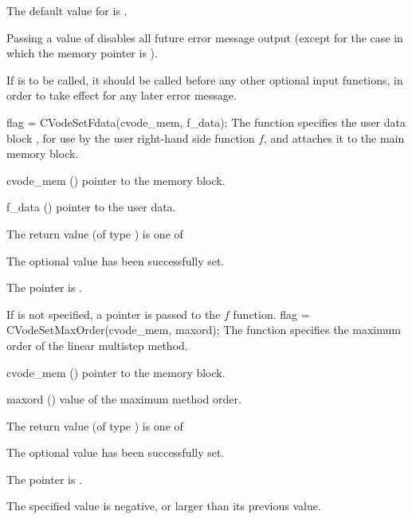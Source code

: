 {
  The default value for  is . 

  Passing a value of  disables all future error message output
  (except for the case in which the {\cvode} memory pointer is ).

  {\warn}If  is to be called, it should be called before any
  other optional input functions, in order to take effect for any later error message.
}
{
  flag = CVodeSetFdata(cvode\_mem, f\_data);
}
{
  The function  specifies the user data block ,
  for use by the user right-hand side function $f$, and attaches it to the main 
  {\cvode} memory block.
}
{
  \begin{args}
  \item[cvode\_mem] ()
    pointer to the {\cvode} memory block.
  \item[f\_data] ()
    pointer to the user data.
  \end{args}
}
{
  The return value  (of type ) is one of
  \begin{args}
  \item[\Id{CV\_SUCCESS}] 
    The optional value has been successfully set.
  \item[\Id{CV\_MEM\_NULL}]
    The  pointer is .
  \end{args}
}
{
  If  is not specified, a  pointer is
  passed to the $f$ function.
}
{
flag = CVodeSetMaxOrder(cvode\_mem, maxord);
}
{
  The function  specifies the maximum order of the 
  linear multistep method.
}
{
  \begin{args}
  \item[cvode\_mem] ()
    pointer to the {\cvode} memory block.
  \item[maxord] ()
    value of the maximum method order.
  \end{args}
}
{
  The return value  (of type ) is one of
  \begin{args}
  \item[\Id{CV\_SUCCESS}] 
    The optional value has been successfully set.
  \item[\Id{CV\_MEM\_NULL}]
    The  pointer is .
  \item[\Id{CV\_ILL\_INPUT}]
    The specified value  is negative, or larger than 
    its previous value.
  \end{args}
}
